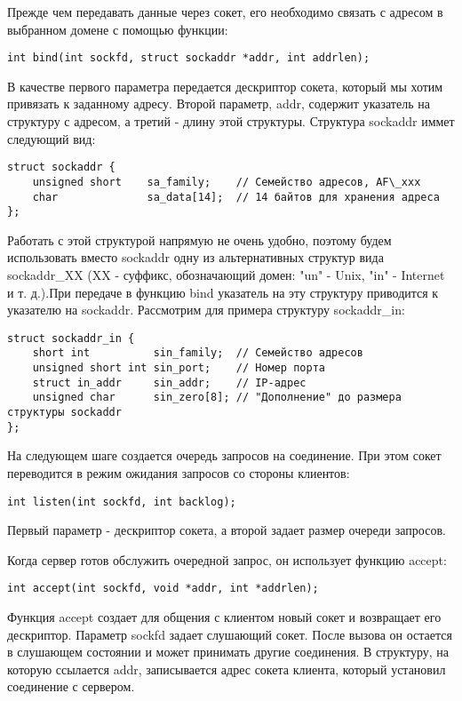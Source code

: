 Прежде чем передавать данные через сокет, его необходимо связать с адресом в выбранном домене  с помощью функции:
\begin{lstlisting}
int bind(int sockfd, struct sockaddr *addr, int addrlen);
\end{lstlisting}
В качестве первого параметра передается дескриптор сокета, который мы хотим привязать к заданному адресу. Второй параметр, addr, содержит указатель на структуру с адресом, а третий - длину этой структуры.
Структура sockaddr иммет следующий вид:
\begin{lstlisting}
struct sockaddr {
    unsigned short    sa_family;    // Семейство адресов, AF\_xxx
    char              sa_data[14];  // 14 байтов для хранения адреса
};
\end{lstlisting}

Работать с этой структурой напрямую не очень удобно, поэтому будем использовать вместо sockaddr одну из альтернативных структур вида sockaddr\_XX (XX - суффикс, обозначающий домен: "un" - Unix, "in" - Internet и т. д.).При передаче в функцию bind указатель на эту структуру приводится к указателю на sockaddr. Рассмотрим для примера структуру sockaddr\_in:
\begin{lstlisting}
struct sockaddr_in {
    short int          sin_family;  // Семейство адресов
    unsigned short int sin_port;    // Номер порта
    struct in_addr     sin_addr;    // IP-адрес
    unsigned char      sin_zero[8]; // "Дополнение" до размера структуры sockaddr
};
\end{lstlisting}

На следующем шаге создается очередь запросов на соединение. При этом сокет переводится в режим ожидания запросов со стороны клиентов:
\begin{lstlisting}
int listen(int sockfd, int backlog);
\end{lstlisting}
Первый параметр - дескриптор сокета, а второй задает размер очереди запросов.

Когда сервер готов обслужить очередной запрос, он использует функцию accept:
\begin{lstlisting}
int accept(int sockfd, void *addr, int *addrlen);
\end{lstlisting}
Функция accept создает для общения с клиентом новый сокет и возвращает его дескриптор. Параметр sockfd задает слушающий сокет. После вызова он остается в слушающем состоянии и может принимать другие соединения. В структуру, на которую ссылается addr, записывается адрес сокета клиента, который установил соединение с сервером.

